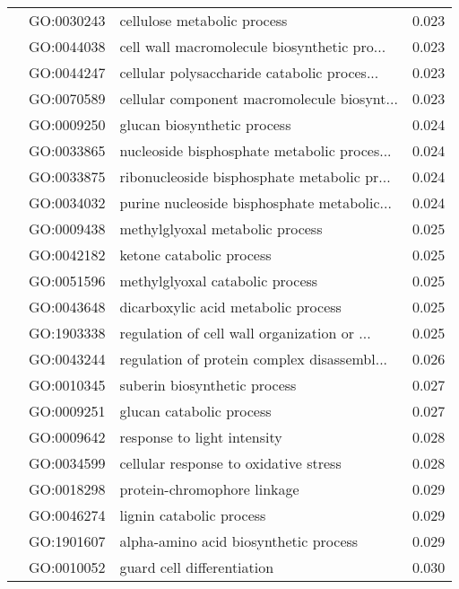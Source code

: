 \begin{longtable}{lllr}
   & GO:0030243 &                  cellulose metabolic process &         0.023 \\
   & GO:0044038 &  cell wall macromolecule biosynthetic pro... &         0.023 \\
   & GO:0044247 &  cellular polysaccharide catabolic proces... &         0.023 \\
   & GO:0070589 &  cellular component macromolecule biosynt... &         0.023 \\
   & GO:0009250 &                  glucan biosynthetic process &         0.024 \\
   & GO:0033865 &  nucleoside bisphosphate metabolic proces... &         0.024 \\
   & GO:0033875 &  ribonucleoside bisphosphate metabolic pr... &         0.024 \\
   & GO:0034032 &  purine nucleoside bisphosphate metabolic... &         0.024 \\
   & GO:0009438 &              methylglyoxal metabolic process &         0.025 \\
   & GO:0042182 &                     ketone catabolic process &         0.025 \\
   & GO:0051596 &              methylglyoxal catabolic process &         0.025 \\
   & GO:0043648 &          dicarboxylic acid metabolic process &         0.025 \\
   & GO:1903338 &  regulation of cell wall organization or ... &         0.025 \\
   & GO:0043244 &  regulation of protein complex disassembl... &         0.026 \\
   & GO:0010345 &                 suberin biosynthetic process &         0.027 \\
   & GO:0009251 &                     glucan catabolic process &         0.027 \\
   & GO:0009642 &                  response to light intensity &         0.028 \\
   & GO:0034599 &        cellular response to oxidative stress &         0.028 \\
   & GO:0018298 &                  protein-chromophore linkage &         0.029 \\
   & GO:0046274 &                     lignin catabolic process &         0.029 \\
   & GO:1901607 &        alpha-amino acid biosynthetic process &         0.029 \\
   & GO:0010052 &                   guard cell differentiation &         0.030 \\

\end{longtable}
